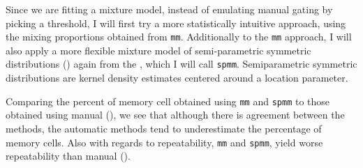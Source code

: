 Since we are fitting a mixture model, instead of emulating manual gating by picking a threshold,
I will first try a more statistically intuitive approach, using the mixing proportions obtained from \texttt{mm}.
Additionally to the \texttt{mm} approach, I will also apply a more flexible mixture model of semi-parametric symmetric distributions () again from the , which I will call \texttt{spmm}.
Semiparametric symmetric distributions are kernel density estimates centered around a location parameter.

Comparing the percent of memory cell obtained using \texttt{mm} and \texttt{spmm} to those obtained using manual (), we see that
although there is agreement between the methods, the automatic methods tend to underestimate the percentage of memory cells.
Also with regards to repeatability, \texttt{mm} and \texttt{spmm}, yield worse repeatability than manual ().



